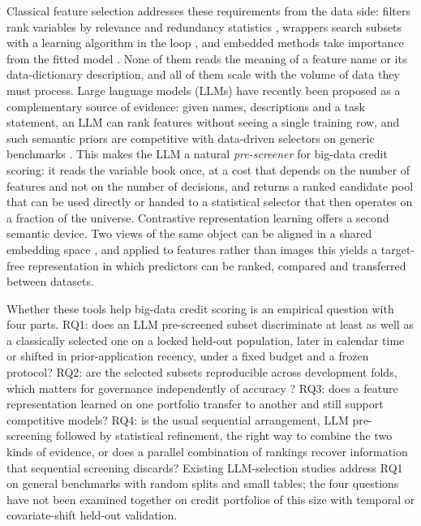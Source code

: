 \documentclass[final,5p,twocolumn]{elsarticle}
\begin{document}
Classical feature selection addresses these requirements from the data side: filters rank variables by relevance and redundancy statistics \cite{guyon2003,peng2005}, wrappers search subsets with a learning algorithm in the loop \cite{kohavi1997,guyon2002,kursa2010}, and embedded methods take importance from the fitted model \cite{tibshirani1996,lundberg2017}. None of them reads the meaning of a feature name or its data-dictionary description, and all of them scale with the volume of data they must process. Large language models (LLMs) have recently been proposed as a complementary source of evidence: given names, descriptions and a task statement, an LLM can rank features without seeing a single training row, and such semantic priors are competitive with data-driven selectors on generic benchmarks \cite{choi2022,jeong2025,li2025sigkdd,zhang2025llmlasso}. This makes the LLM a natural \emph{pre-screener} for big-data credit scoring: it reads the variable book once, at a cost that depends on the number of features and not on the number of decisions, and returns a ranked candidate pool that can be used directly or handed to a statistical selector that then operates on a fraction of the universe. Contrastive representation learning offers a second semantic device. Two views of the same object can be aligned in a shared embedding space \cite{radford2021,oord2018}, and applied to features rather than images this yields a target-free representation in which predictors can be ranked, compared and transferred between datasets.

Whether these tools help big-data credit scoring is an empirical question with four parts. RQ1: does an LLM pre-screened subset discriminate at least as well as a classically selected one on a locked held-out population, later in calendar time or shifted in prior-application recency, under a fixed budget and a frozen protocol? RQ2: are the selected subsets reproducible across development folds, which matters for governance independently of accuracy \cite{kalousis2007,nogueira2018}? RQ3: does a feature representation learned on one portfolio transfer to another and still support competitive models? RQ4: is the usual sequential arrangement, LLM pre-screening followed by statistical refinement, the right way to combine the two kinds of evidence, or does a parallel combination of rankings recover information that sequential screening discards? Existing LLM-selection studies address RQ1 on general benchmarks with random splits and small tables; the four questions have not been examined together on credit portfolios of this size with temporal or covariate-shift held-out validation.
\end{document}
